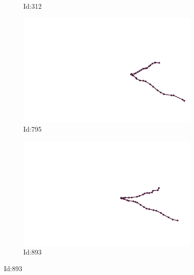 \documentclass[12pt,twoside]{report}
\begin{document}
\begin{figure}
\begin{subfigure}[b]{0.20\textwidth}
\caption{Id:312}
\end{subfigure}
\begin{subfigure}[b]{0.20\textwidth}
\centering
\includegraphics[width=\textwidth]{../../trajectories/795.png}
\caption{Id:795}
\end{subfigure}
\begin{subfigure}[b]{0.20\textwidth}
\centering
\includegraphics[width=\textwidth]{../../trajectories/893.png}
\caption{Id:893}
\end{subfigure}
\end{figure}
\end{document}
